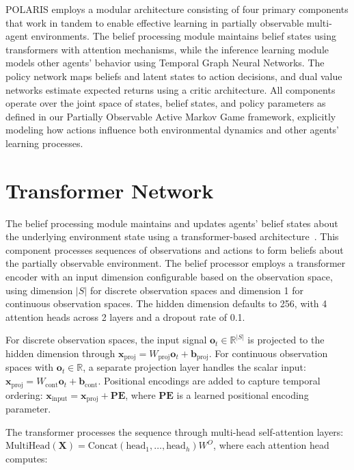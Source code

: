 POLARIS employs a modular architecture consisting of four primary components that work in tandem to enable effective learning in partially observable multi-agent environments. The belief processing module maintains belief states using transformers with attention mechanisms, while the inference learning module models other agents' behavior using Temporal Graph Neural Networks. The policy network maps beliefs and latent states to action decisions, and dual value networks estimate expected returns using a critic architecture. All components operate over the joint space of states, belief states, and policy parameters as defined in our Partially Observable Active Markov Game framework, explicitly modeling how actions influence both environmental dynamics and other agents' learning processes.

\section{Transformer Network}

The belief processing module maintains and updates agents' belief states about the underlying environment state using a transformer-based architecture~\cite{vaswani2017attention}. This component processes sequences of observations and actions to form beliefs about the partially observable environment. The belief processor employs a transformer encoder with an input dimension configurable based on the observation space, using dimension $|S|$ for discrete observation spaces and dimension 1 for continuous observation spaces. The hidden dimension defaults to 256, with 4 attention heads across 2 layers and a dropout rate of 0.1.

For discrete observation spaces, the input signal $\mathbf{o}_t \in \mathbb{R}^{|S|}$ is projected to the hidden dimension through $\mathbf{x}_{\text{proj}} = W_{\text{proj}}\mathbf{o}_t + \mathbf{b}_{\text{proj}}$. For continuous observation spaces with $\mathbf{o}_t \in \mathbb{R}$, a separate projection layer handles the scalar input: $\mathbf{x}_{\text{proj}} = W_{\text{cont}}\mathbf{o}_t + \mathbf{b}_{\text{cont}}$. Positional encodings are added to capture temporal ordering: $\mathbf{x}_{\text{input}} = \mathbf{x}_{\text{proj}} + \mathbf{PE}$, where $\mathbf{PE}$ is a learned positional encoding parameter.

The transformer processes the sequence through multi-head self-attention layers: $\text{MultiHead}(\mathbf{X}) = \text{Concat}(\text{head}_1, \ldots, \text{head}_h)W^O$, where each attention head computes:

